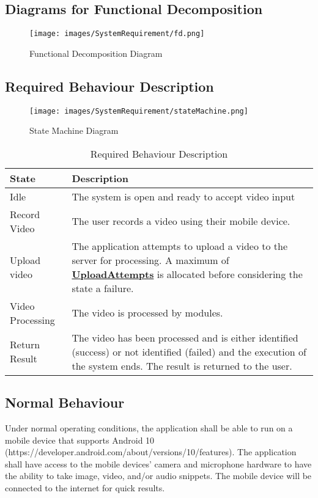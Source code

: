 \documentclass[titlepage]{article}
\begin{document}
\subsection{Diagrams for Functional Decomposition}
\begin{figure}[H]
    \centering
    \texttt{[image: images/SystemRequirement/fd.png]}
    \caption{Functional Decomposition Diagram}
    \label{fig:Functional_Decomposition}
\end{figure}

\subsection{Required Behaviour Description}
\begin{figure}[H]
    \centering
    \texttt{[image: images/SystemRequirement/stateMachine.png]}
    \caption{State Machine Diagram}
    \label{fig:State_Machine}
\end{figure}
\begin{table}[h!]
    \centering
    \begin{tabularx}{\textwidth}{|l|X|}
    \hline
    \textbf {State}  & \textbf {Description} \\
    \hline
    Idle & The system is open and ready to accept video input\\
    \hline
    Record Video & The user records a video using their mobile device.\\
    \hline
    Upload video & The application attempts to upload a video to the server for processing. A maximum of \hyperref[tab:Variables]{\textbf{UploadAttempts}} is allocated before considering the state a failure.\\
    \hline
    Video Processing & The video is processed by modules.\\
    \hline
    Return Result & The video has been processed and is either identified (success) or not identified (failed) and the execution of the system ends. The result is returned to the user.\\
    \hline
    \end{tabularx}
    \caption{Required Behaviour Description}
    \label{tab:States}
\end{table}

\subsection{Normal Behaviour}
Under normal operating conditions, the application shall be able to run on a mobile device that supports Android 10 (https://developer.android.com/about/versions/10/features). The application shall have access to the mobile devices’ camera and microphone hardware to have the ability to take image, video, and/or audio snippets. The mobile device will be connected to the internet for quick results. 
\end{document}
